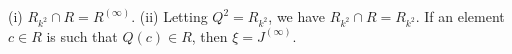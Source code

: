 (i) $R_{k^2} \cap R = R^{(\infty)}$.
(ii) Letting $Q^2 = R_{k^2}$, we have $R_{k^2} \cap R = R_{k^2}$. If an element $c \in R$ is such that $Q(c) \in R$, then $\xi = J^{(\infty)}$.
